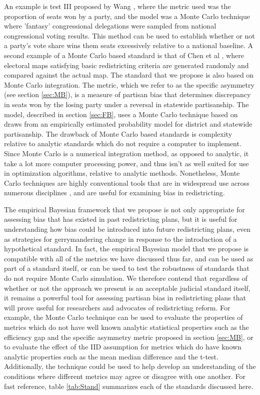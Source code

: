 \documentclass[preprint,12pt]{article}
\begin{document}
An example is test III proposed by Wang \cite{Wang__,Wang_2016_10.1089/elj.2016.0387}, where the metric used was the proportion of seats won by a party, and the model was a Monte Carlo technique where 'fantasy' congressional delegations were sampled from national congressional voting results.
This method can be used to establish whether or not a party's vote share wins them seats excessively relative to a national baseline.
A second example of a Monte Carlo based standard is that of Chen et al \cite{Chen_2015_10.1089/elj.2015.0317,Chen_2016_10.1016/j.electstud.2016.06.014}, where electoral maps satisfying basic redistricting criteria are generated randomly and compared against the actual map.
The standard that we propose is also based on Monte Carlo integration.
The metric, which we refer to as the specific asymmetry (see section \ref{sec:MB}), is a measure of partisan bias that determines discrepancy in seats won by the losing party under a reversal in statewide partisanship.  
The model, described in section \ref{sec:FB}, uses a Monte Carlo technique based on draws from an empirically estimated probability model for district and statewide partisanship.
The drawback of Monte Carlo based standards is complexity relative to analytic standards which do not require a computer to implement.
Since Monte Carlo is a numerical integration method, as opposed to analytic, it take a lot more computer processing power, and thus isn't as well suited for use in optimization algorithms, relative to analytic methods.
Nonetheless, Monte Carlo techniques are highly conventional tools that are in widespread use across numerous disciplines \cite{Kroese_2014_10.1002/wics.1314}, and are useful for examining bias in redistricting.

The empirical Bayesian framework that we propose is not only appropriate for assessing bias that has existed in past redistricting plans, but it is useful for understanding how bias could be introduced into future redistricting plans, even as strategies for gerrymandering change in response to the introduction of a hypothetical standard.
In fact, the empirical Bayesian model that we propose is compatible with all of the metrics we have discussed thus far, and can be used as part of a standard itself, or can be used to test the robustness of standards that do not require Monte Carlo simulation. 
We therefore contend that regardless of whether or not the approach we present is an acceptable judicial standard itself, it remains a powerful tool for assessing partisan bias in redistricting plans that will prove useful for researchers and advocates of redistricting reform.
For example, the Monte Carlo technique can be used to evaluate the properties of metrics which do not have well known analytic statistical properties such as the efficiency gap and the specific asymmetry metric proposed in section \ref{sec:MB}, or to evaluate the effect of the IID assumption for metrics which do have known analytic properties such as the mean median difference and the t-test.
Additionally, the technique could be used to help develop an understanding of the conditions where different metrics may agree or disagree with one another.
For fast reference, table \ref{tab:Stand} summarizes each of the standards discussed here. 
\end{document}
